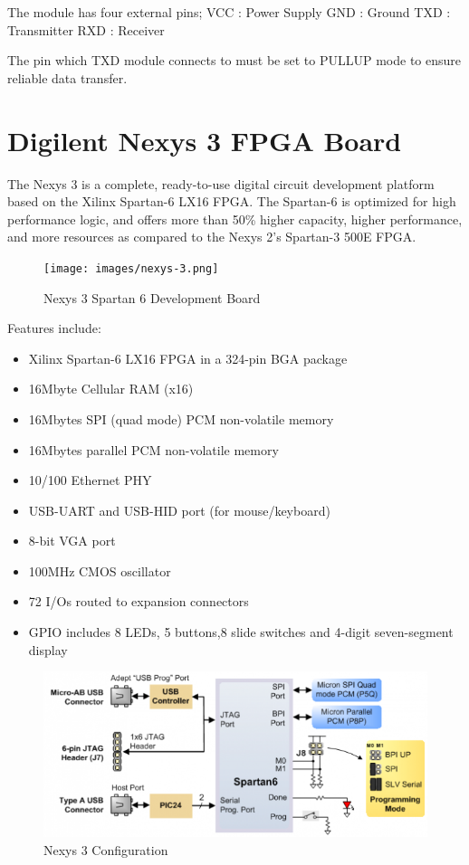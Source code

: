 The module has four external pins; 
VCC : Power Supply
GND : Ground
TXD : Transmitter
RXD : Receiver   

The pin which TXD module connects to must be set to PULLUP mode to ensure reliable data transfer. 


\section{Digilent Nexys 3 FPGA Board}

The Nexys 3 is a complete, ready-to-use digital circuit development platform based on the Xilinx Spartan-6 LX16 FPGA. The Spartan-6 is optimized for high performance logic, and offers more than 50\% higher capacity, higher performance, and more resources as compared to the Nexys 2's Spartan-3 500E FPGA.

\begin{figure}
	\centering
	\texttt{[image: images/nexys-3.png]}
	\caption{Nexys 3 Spartan 6 Development Board}
\end{figure}

Features include:

\begin{itemize}
\item Xilinx Spartan-6 LX16 FPGA in a 324-pin BGA package
\item 16Mbyte Cellular RAM (x16)
\item 16Mbytes SPI (quad mode) PCM non-volatile memory
\item 16Mbytes parallel PCM non-volatile memory
\item 10/100 Ethernet PHY
\item USB-UART and USB-HID port (for mouse/keyboard)
\item 8-bit VGA port
\item 100MHz CMOS oscillator
\item 72 I/Os routed to expansion connectors
\item GPIO includes 8 LEDs, 5 buttons,8 slide switches and 4-digit seven-segment display
\end{itemize}

\begin{figure}
	\centering
	\includegraphics[scale=0.7]{images/nexys-3-config.png}
	\caption{Nexys 3 Configuration }
\end{figure}

